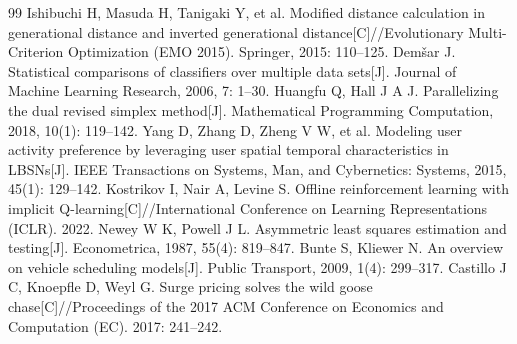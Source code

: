 \documentclass[twocolumn]{article}
\begin{document}
\begin{thebibliography}{99}
 Ishibuchi H, Masuda H, Tanigaki Y, et al. Modified distance calculation in generational distance and inverted generational distance[C]//Evolutionary Multi-Criterion Optimization (EMO 2015). Springer, 2015: 110--125.
 Dem\v{s}ar J. Statistical comparisons of classifiers over multiple data sets[J]. Journal of Machine Learning Research, 2006, 7: 1--30.
 Huangfu Q, Hall J A J. Parallelizing the dual revised simplex method[J]. Mathematical Programming Computation, 2018, 10(1): 119--142.
 Yang D, Zhang D, Zheng V W, et al. Modeling user activity preference by leveraging user spatial temporal characteristics in LBSNs[J]. IEEE Transactions on Systems, Man, and Cybernetics: Systems, 2015, 45(1): 129--142.
 Kostrikov I, Nair A, Levine S. Offline reinforcement learning with implicit Q-learning[C]//International Conference on Learning Representations (ICLR). 2022.
 Newey W K, Powell J L. Asymmetric least squares estimation and testing[J]. Econometrica, 1987, 55(4): 819--847.
 Bunte S, Kliewer N. An overview on vehicle scheduling models[J]. Public Transport, 2009, 1(4): 299--317.
 Castillo J C, Knoepfle D, Weyl G. Surge pricing solves the wild goose chase[C]//Proceedings of the 2017 ACM Conference on Economics and Computation (EC). 2017: 241--242.
\end{thebibliography}
\end{document}

